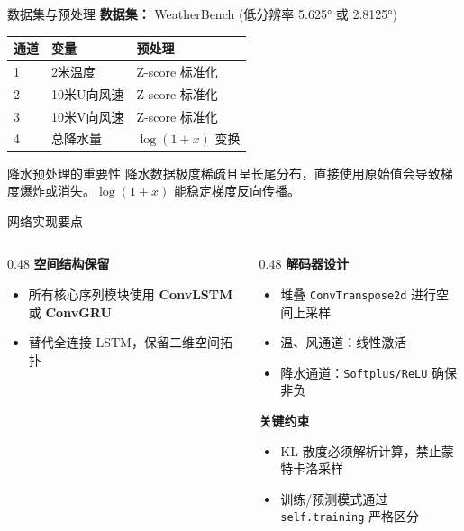 \documentclass[10pt,aspectratio=1610]{beamer}
\begin{document}
\begin{frame}{数据集与预处理}
    \textbf{数据集：} WeatherBench (低分辨率 5.625° 或 2.8125°)
    \vspace{0.3cm}
    \begin{table}
        \centering
        \begin{tabular}{@{}lll@{}}
            \toprule
            \textbf{通道} & \textbf{变量}  & \textbf{预处理}   \\
            \midrule
            1           & 2米温度         & Z-score 标准化    \\
            2           & 10米U向风速      & Z-score 标准化    \\
            3           & 10米V向风速      & Z-score 标准化    \\
            4           & \alert{总降水量} & $\log(1+x)$ 变换 \\
            \bottomrule
        \end{tabular}
    \end{table}
    \vspace{0.3cm}
    \begin{alertblock}{降水预处理的重要性}
        降水数据极度稀疏且呈长尾分布，直接使用原始值会导致梯度爆炸或消失。$\log(1+x)$ 能稳定梯度反向传播。
    \end{alertblock}
\end{frame}

\begin{frame}{网络实现要点}
    \begin{columns}
        \begin{column}{0.48\textwidth}
            \textbf{空间结构保留}
            \begin{itemize}
                \item 所有核心序列模块使用 \textbf{ConvLSTM} 或 \textbf{ConvGRU}
                \item 替代全连接 LSTM，保留二维空间拓扑
            \end{itemize}
        \end{column}
        \begin{column}{0.48\textwidth}
            \textbf{解码器设计}
            \begin{itemize}
                \item 堆叠 \texttt{ConvTranspose2d} 进行空间上采样
                \item 温、风通道：线性激活
                \item 降水通道：\texttt{Softplus/ReLU} 确保非负
            \end{itemize}
            \vspace{0.3cm}
            \textbf{关键约束}
            \begin{itemize}
                \item KL 散度必须\alert{解析计算}，禁止蒙特卡洛采样
                \item 训练/预测模式通过 \texttt{self.training} 严格区分
            \end{itemize}
        \end{column}
    \end{columns}
\end{frame}
\end{document}
